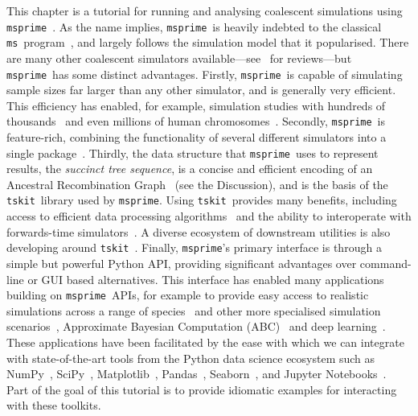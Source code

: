 \documentclass[graybox]{svmult}
\newcommand{\msprime}[0]{\texttt{msprime}}
\newcommand{\tskit}[0]{\texttt{tskit}}
\newcommand{\ms}[0]{\texttt{ms}}
\begin{document}
This chapter is a tutorial for running and analysing coalescent simulations
using \msprime~\citep{kelleher2016efficient,baumdicker2022efficient}.
As the name implies, \msprime\ is heavily indebted to the classical
\ms\ program~\citep{hudson2002generating}, and largely follows the
simulation model that it popularised.
There are many other coalescent simulators available---see~\citep{carvajal2008simulation,liu2008survey,arenas2012simulation,
yuan2012overview,hoban2012computer} for reviews---but \msprime\ has
some distinct advantages.
Firstly, \msprime\ is capable of simulating
sample sizes far larger than any other simulator, and is generally
very efficient. This efficiency has enabled, for example,
simulation
studies with hundreds of
thousands~\citep{martin2017human,martin2020correction,ragsdale2020lessons}
and even millions of human chromosomes~\citep{andersontrocme2023genes}.
Secondly, \msprime\ is feature-rich, combining the functionality of
several different simulators into a single
package~\citep{baumdicker2022efficient}.
Thirdly, the data structure that \msprime\ uses
to represent results,
the \emph{succinct tree sequence},
is a concise and efficient encoding of
an Ancestral Recombination Graph~\citep{wong2024general}
(see the Discussion),
and is the basis of the \tskit\ library used by \msprime.
Using \tskit\ provides many benefits, including access to efficient
data processing algorithms~\citep{ralph2020efficiently,lehmann2025on}
and the ability to interoperate with forwards-time
simulators~\citep{kelleher2018efficient,haller2018tree}.
A diverse ecosystem of downstream utilities is also developing around
\tskit~\cite{fan2022genealogical,nowbandegani2023extremely,tsambos2023link,
tagami2024tstrait,fritze2024forest}.
Finally, \msprime's primary interface is through a simple but powerful Python
API, providing significant advantages over command-line or GUI based alternatives.
This interface has enabled many applications building
on \msprime\ APIs, for example to provide easy access to
realistic simulations across a range of
species~\citep{adrion2020stdpopsim,lauterbur2023expanding,gower2025accessible}
and other more specialised simulation
scenarios~\citep{mckenzie2020ipcoal,rivera2021simulation,petrslendr2023},
Approximate Bayesian Computation (ABC)~\citep{huang2025estimating}
and deep learning~\cite{korfmann2023deep}.
These applications have been facilitated by the ease with
which we can integrate with state-of-the-art tools from the
Python data science ecosystem such as NumPy~\citep{walt2011numpy},
SciPy~\citep{jones-2018-scipy},
Matplotlib~\citep{hunter2007matplotlib}, Pandas~\citep{mckinney2010data},
Seaborn~\citep{michael_waskom_2017_883859}, and
Jupyter Notebooks~\citep{perez2007ipython}. Part of the goal
of this tutorial is to provide idiomatic examples for interacting
with these toolkits.
\end{document}
